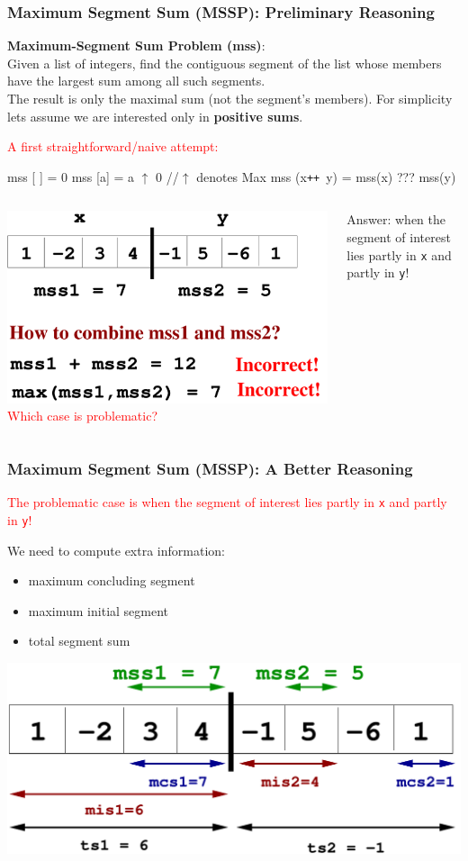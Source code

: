\documentclass{beamer}
\newcommand{\red}[1]{\textcolor{Red}{{#1}}}
\renewcommand{\emph}[1]{\textcolor{CosGreen}{ #1}}
\newcommand{\emp}[1]{\textcolor{DikuRed}{ #1}}
\newcommand{\mymath}[1]{$ #1 $}
\begin{document}
\begin{frame}[fragile,t]
  \frametitle{Maximum Segment Sum (MSSP): Preliminary Reasoning}

\emp{\bf Maximum-Segment Sum Problem ({\sc mss})}: \\
Given a list of integers, find the contiguous segment of the list 
whose members have the largest sum among all such segments.\\
The result is only the maximal sum (not the segment's members).
For simplicity lets assume we are interested only in {\bf positive sums}.
\medskip

\red{A first straightforward/naive attempt:}
\begin{colorcode}
mss [ ]      = 0
mss [a]      = a \mymath{\uparrow} 0  \emp{//\mymath{\uparrow} denotes Max}
mss (x{\tt ++}\mbox{ }y) = mss(x) ??? mss(y)
\end{colorcode}

\bigskip
\bigskip

\begin{columns}
\pause
\includegraphics[height=20ex]{img/day3/mssp1}
\red{Which case is problematic?}\pause\bigskip

\emph{Answer: when the segment of interest lies partly in {\tt x} and partly in {\tt y}!}
\end{columns}
\end{frame}

\begin{frame}[fragile,t]
  \frametitle{Maximum Segment Sum (MSSP): A Better Reasoning}

\red{The problematic case is when the segment of interest lies
     partly in {\tt x} and partly in {\tt y}!}
\bigskip

We need to compute extra information:\pause
\begin{itemize}
    \item maximum concluding segment
    \item maximum initial segment
    \item total segment sum
\end{itemize}\smallskip\pause

\includegraphics[height=22ex]{img/day3/mssp2}

\end{frame}
\end{document}
